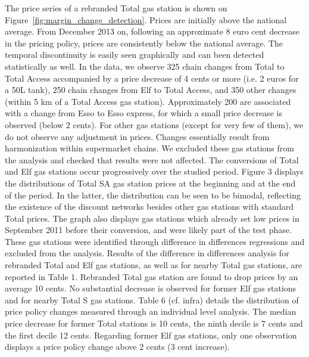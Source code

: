 \documentclass[english]{article}
\begin{document}
The price series of a rebranded Total gas station is shown on Figure~\ref{fig:margin_change_detection}. Prices are initially above the national average. From December 2013 on, following an approximate 8 euro cent decrease in the pricing policy, prices are consistently below the national average. The temporal discontinuity is easily seen graphically and can been detected statistically as well. In the data, we observe 325 chain changes from Total to Total Access accompanied by a price decrease of 4 cents or more (i.e. 2 euros for a 50L tank), 250 chain changes from Elf to Total Access, and 350 other changes (within 5 km of a Total Access gas station). Approximately 200  are associated with a change from Esso to Esso express, for which a small price decrease is observed (below 2 cents). For other gas stations (except for very few of them), we do not observe any adjustment in prices. Changes essentially result from harmonization within supermarket chains. We excluded these gas stations from the analysis and checked that results were not affected. The conversions of Total and Elf gas stations occur progressively over the studied period. Figure 3 displays the distributions of Total SA gas station prices at the beginning and at the end of the period. In the latter, the distribution can be seen to be bimodal, reflecting the existence of the discount networks besides other gas stations with standard Total prices. The graph also displays gas stations which already set low prices in September 2011 before their conversion, and were likely part of the test phase. These gas stations were identified through difference in differences regressions and excluded from the analysis. Results of the difference in differences analysis for rebranded Total and Elf gas stations, as well as for nearby Total gas stations, are reported in Table 1. Rebranded Total gas station are found to drop prices by an average 10 cents. No substantial decrease is observed for former Elf gas stations and for nearby Total S gas stations. Table 6 (cf. infra) details the distribution of price policy changes measured through an individual level analysis. The median price decrease for former Total stations is 10 cents, the ninth decile is 7 cents and the first decile 12 cents. Regarding former Elf gas stations, only one observation displays a price policy change above 2 cents (3 cent increase).
\end{document}

